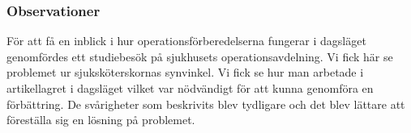 



\subsubsection{Observationer}
För att få en inblick i hur operationsförberedelserna fungerar i dagsläget genomfördes ett studiebesök på sjukhusets operationsavdelning. Vi fick här se problemet ur sjuksköterskornas synvinkel. Vi fick se hur man arbetade i artikellagret i dagsläget vilket var nödvändigt för att kunna genomföra en förbättring. De svårigheter som beskrivits blev tydligare och det blev lättare att föreställa sig en lösning på problemet.

